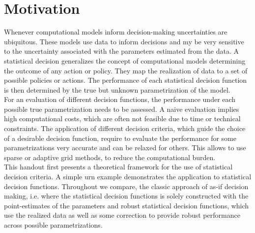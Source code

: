 \section{Motivation}
Whenever computational models inform decision-making uncertainties are ubiquitous. These models use data to inform decisions and my be very sensitive to the uncertainty associated with the parameters estimated from the data. A statistical decision generalizes the concept of computational models determining the outcome of any action or policy. They map the realization of data to a set of possible policies or actions. The performance of each statistical decision function is then determined by the true but unknown parametrization of the model. \\

For an evaluation of different decision functions, the performance under each possible true parametrization needs to be assessed. A naive evaluation implies high computational costs, which are often not feasible due to time or technical constraints. The application of different decision criteria, which guide the choice of a desirable decision function, require to evaluate the performance for some parametrizations very accurate and can be relaxed for others. This allows to use sparse or adaptive grid methods, to reduce the computational burden. \\

This handout first presents a theoretical framework for the use of statistical decision criteria. A simple urn example demonstrates the application to statistical decision functions. Throughout we compare, the classic approach of as-if decision making, i.e. where the statistical decision functions is solely constructed with the point-estimates of the parameters and robust statistical decision functions, which use the realized data as well as some correction to provide robust performance across possible parametrizations.
